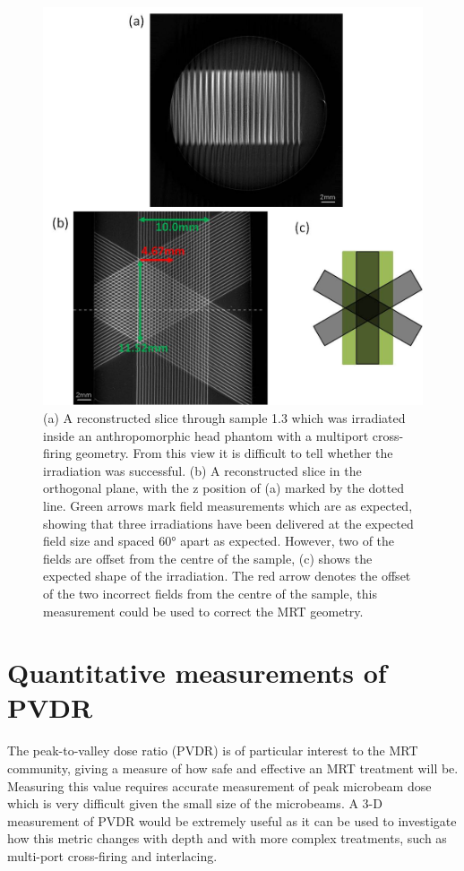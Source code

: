 	
	\begin{figure}
		\centering
		\includegraphics[width=0.9\linewidth]{mrt_img/mrt_Fig4}
		\caption{(a) A reconstructed slice through sample 1.3 which was irradiated inside an anthropomorphic head phantom with a multiport cross-firing geometry. From this view it is difficult to tell whether the irradiation was successful. (b) A reconstructed slice in the orthogonal plane, with the z position of (a) marked by the dotted line. Green arrows mark field measurements which are as expected, showing that three irradiations have been delivered at the expected field size and spaced \ang{60} apart as expected. However, two of the fields are offset from the centre of the sample, (c) shows the expected shape of the irradiation. The red arrow denotes the offset of the two incorrect fields from the centre of the sample, this measurement could be used to correct the MRT geometry.}
		\label{fig:Fig4L7}
	\end{figure}
	
	
	
	
	\section{Quantitative measurements of PVDR}
	\label{sec:quantPVDR}
	
	The peak-to-valley dose ratio (PVDR) is of particular interest to the MRT community, giving a measure of how safe and effective an MRT treatment will be. Measuring this value requires accurate measurement of peak microbeam dose which is very difficult given the small size of the microbeams. A 3-D measurement of PVDR would be extremely useful as it can be used to investigate how this metric changes with depth and with more complex treatments, such as multi-port cross-firing and interlacing.
	
